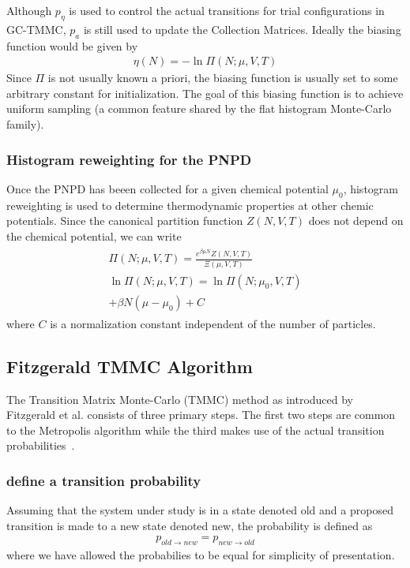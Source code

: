 \documentclass[letterpaper,twocolumn,amsmath,amssymb,pre,aps,10pt]{revtex4-1}
\begin{document}
Although $p_{\eta}$ is used to control the actual transitions for trial configurations
in GC-TMMC, $p_{a}$ is still used to update the Collection Matrices.  Ideally the biasing
function would be given by 
\begin{align}
  \eta(N) = -\ln\Pi(N;\mu,V,T)
\end{align}
Since $\Pi$ is not usually known a priori, the biasing function is usually set to some 
arbitrary constant for initialization.  The goal of this biasing function is to achieve
uniform sampling (a common feature shared by the flat histogram Monte-Carlo family).

\subsubsection{Histogram reweighting for the PNPD}
Once the PNPD has beeen collected for a given chemical potential $\mu_0$, histogram 
reweighting is used to determine thermodynamic properties at other chemic potentials.  
Since the canonical partition function $Z(N,V,T)$ does not depend on the chemical 
potential, we can write
\begin{align}
\begin{split}
  \Pi(N;\mu,V,T) = \frac{e^{\beta\mu N}Z(N,V,T)}{\Xi(\mu,V,T)}\\
  \ln\Pi(N;\mu,V,T) = \ln\Pi(N;\mu_0,V,T) \\
  + \beta N(\mu-\mu_0) + C
\end{split}
\end{align}
where $C$ is a normalization constant independent of the number of particles.

\subsection{Fitzgerald TMMC Algorithm}
The Transition Matrix Monte-Carlo (TMMC) method as introduced by Fitzgerald et al.
consists of three primary steps.  The first two steps are common to the Metropolis 
algorithm while the third makes use of the actual transition 
probabilities~\cite{fitzgerald2000monte}.

\subsubsection{define a transition probability}
Assuming that the system under study is in a state denoted old and a proposed transition
is made to a new state denoted new, the probability is defined as
\begin{align}
  p_{old \rightarrow new} = p_{new \rightarrow old}
\end{align}
where we have allowed the probabilies to be equal for simplicity of presentation.
\end{document}
